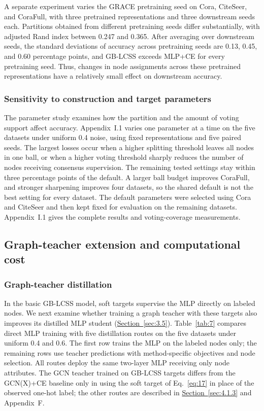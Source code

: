 \documentclass[10pt,letterpaper,nopreprintline]{elsarticle}
\theoremstyle{plain}
\begin{document}
A separate experiment varies the GRACE pretraining seed on Cora, CiteSeer, and CoraFull, with three pretrained representations and three downstream seeds each. Partitions obtained from different pretraining seeds differ substantially, with adjusted Rand index \cite{ref74} between 0.247 and 0.365. After averaging over downstream seeds, the standard deviations of accuracy across pretraining seeds are 0.13, 0.45, and 0.60 percentage points, and GB-LCSS exceeds MLP+CE for every pretraining seed. Thus, changes in node assignments across these pretrained representations have a relatively small effect on downstream accuracy.

\subsubsection{Sensitivity to construction and target parameters}\label{sec:4.3.4}

The parameter study examines how the partition and the amount of voting support affect accuracy. Appendix~I.1 varies one parameter at a time on the five datasets under uniform 0.4 noise, using fixed representations and five paired seeds. The largest losses occur when a higher splitting threshold leaves all nodes in one ball, or when a higher voting threshold sharply reduces the number of nodes receiving consensus supervision. The remaining tested settings stay within three percentage points of the default. A larger ball budget improves CoraFull, and stronger sharpening improves four datasets, so the shared default is not the best setting for every dataset. The default parameters were selected using Cora and CiteSeer and then kept fixed for evaluation on the remaining datasets. Appendix~I.1 gives the complete results and voting-coverage measurements.


\subsection{Graph-teacher extension and computational cost}\label{sec:4.4}

\subsubsection{Graph-teacher distillation}\label{sec:4.4.1}

In the basic GB-LCSS model, soft targets supervise the MLP directly on labeled nodes. We next examine whether training a graph teacher with these targets also improves its distilled MLP student (\hyperref[sec:3.5]{Section~\ref*{sec:3.5}}). Table~\ref{tab:7} compares direct MLP training with five distillation routes on the five datasets under uniform 0.4 and 0.6. The first row trains the MLP on the labeled nodes only; the remaining rows use teacher predictions with method-specific objectives and node selection. All routes deploy the same two-layer MLP receiving only node attributes. The GCN teacher trained on GB-LCSS targets differs from the GCN(X)+CE baseline only in using the soft target of Eq.~\eqref{eq:17} in place of the observed one-hot label; the other routes are described in \hyperref[sec:4.1.3]{Section~\ref*{sec:4.1.3}} and Appendix~F.
\end{document}
